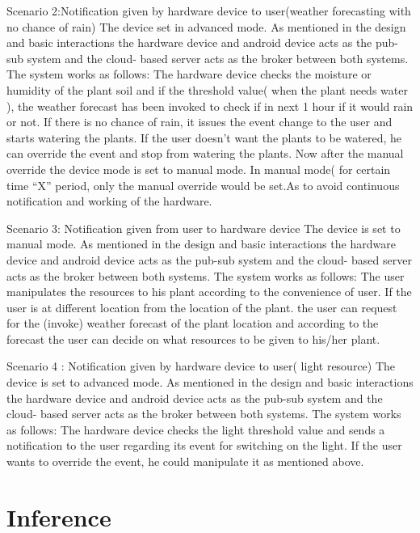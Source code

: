 \documentclass[10pt]{article}
\begin{document}
Scenario 2:Notification given by hardware device to user(weather forecasting with no chance of rain)
The device set in advanced mode.
As mentioned in the design and basic interactions the hardware device and android device acts as the pub-sub system and the cloud- based server acts as the broker between both systems. The system works as follows:
The hardware device checks the moisture or humidity of the plant soil and if the threshold value( when the plant needs water ), the weather forecast has been invoked to check if in next 1 hour if it would rain or not.
If there is no chance of rain, it issues the event change to the user and starts watering the plants.
If the user doesn’t want the plants to be watered, he can override the event and stop from watering the plants.
Now after the manual override the device mode is set to manual mode. In manual mode( for certain time “X” period, only the manual override would be set.As to avoid continuous notification and working of the hardware.

Scenario 3: Notification given from user to hardware device
The device is set to manual mode.
As mentioned in the design and basic interactions the hardware device and android device acts as the pub-sub system and the cloud- based server acts as the broker between both systems. The system works as follows:
The user manipulates the resources to his plant according to the convenience of user.
If the user is at different location from the location of the plant. the user can request for the (invoke) weather forecast of the plant location and according to the forecast the user can decide on what resources to be given to his/her plant.

Scenario 4 : Notification given by hardware device to user( light resource)
The device is set to advanced mode.
As mentioned in the design and basic interactions the hardware device and android device acts as the pub-sub system and the cloud- based server acts as the broker between both systems. The system works as follows:
The hardware device checks the light threshold value and sends a notification to the user regarding its event for switching on the light.
If the user wants to override the event, he could manipulate it as mentioned above.



\section*{Inference}

\end{document}
